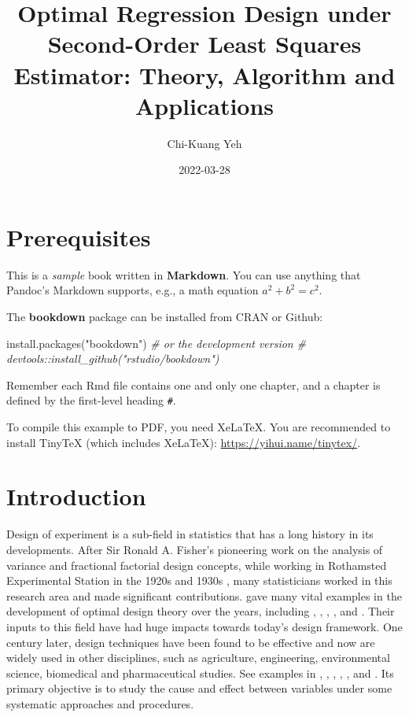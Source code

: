 \documentclass[
]{book}
\title{Optimal Regression Design under Second-Order Least Squares Estimator: Theory, Algorithm and Applications}
\author{Chi-Kuang Yeh}
\date{2022-03-28}
\newenvironment{Shaded}{\begin{snugshade}}{\end{snugshade}}
\newcommand{\CommentTok}[1]{\textcolor[rgb]{0.56,0.35,0.01}{\textit{#1}}}
\newcommand{\FunctionTok}[1]{\textcolor[rgb]{0.00,0.00,0.00}{#1}}
\newcommand{\NormalTok}[1]{#1}
\newcommand{\StringTok}[1]{\textcolor[rgb]{0.31,0.60,0.02}{#1}}
\theoremstyle{definition}
\theoremstyle{definition}
\theoremstyle{definition}
\theoremstyle{definition}
\theoremstyle{remark}
\begin{document}
\maketitle

{
\setcounter{tocdepth}{1}
\tableofcontents
}
\hypertarget{prerequisites}{%
\chapter{Prerequisites}\label{prerequisites}}

This is a \emph{sample} book written in \textbf{Markdown}. You can use anything that Pandoc's Markdown supports, e.g., a math equation \(a^2 + b^2 = c^2\).

The \textbf{bookdown} package can be installed from CRAN or Github:

\begin{Shaded}
\begin{Highlighting}[]
\FunctionTok{install.packages}\NormalTok{(}\StringTok{"bookdown"}\NormalTok{)}
\CommentTok{\# or the development version}
\CommentTok{\# devtools::install\_github("rstudio/bookdown")}
\end{Highlighting}
\end{Shaded}

Remember each Rmd file contains one and only one chapter, and a chapter is defined by the first-level heading \texttt{\#}.

To compile this example to PDF, you need XeLaTeX. You are recommended to install TinyTeX (which includes XeLaTeX): \url{https://yihui.name/tinytex/}.

\hypertarget{intro}{%
\chapter{Introduction}\label{intro}}

Design of experiment is a sub-field in statistics that has a long history in its developments. After Sir Ronald A. Fisher's pioneering work on the analysis of variance and fractional factorial design concepts, while working in Rothamsted Experimental Station in the 1920s and 1930s \citep[p.~21]{montgomery2012introduction}, many statisticians worked in this research area and made significant contributions. \citet{berger2009introduction} gave many vital examples in the development of optimal design theory over the years, including \citet{chernoff1953locally}, \citet{kiefer1959optimum}, \citet{kiefer1974general}, \citet{kiefer-wolfowitz1959optimum}, \citet{silvey1980optimal} and \citet{atkinson1992optimum}. Their inputs to this field have had huge impacts towards today's design framework. One century later, design techniques have been found to be effective and now are widely used in other disciplines, such as agriculture, engineering, environmental science, biomedical and pharmaceutical studies. See examples in \citet{crary2000optimal}, \citet{crary2002design}, \citet{haines2003bayesian}, \citet{zhou2003a}, \citet{jain2003modeling}, \citet{brosi2008optimal} and \citet{schorning2017optimal}. Its primary objective is to study the cause and effect between variables under some systematic approaches and procedures.
\end{document}
